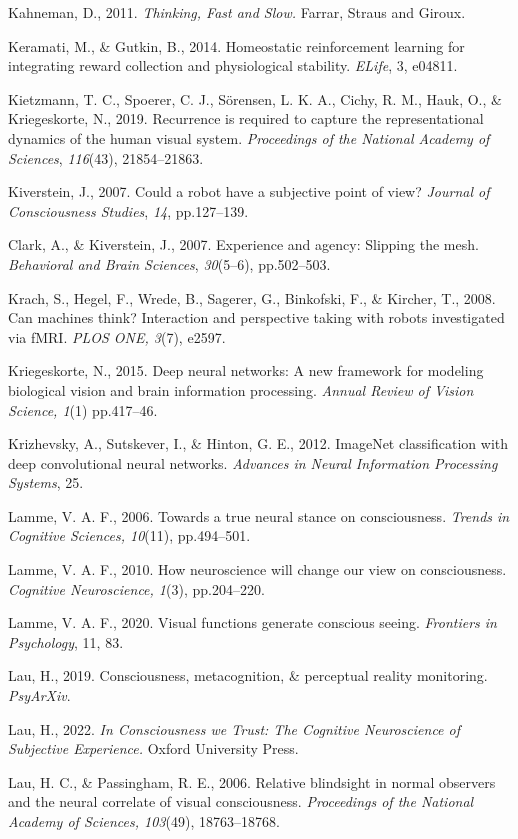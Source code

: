 \documentclass[12pt]{article}
\begin{document}
Kahneman, D., 2011. \emph{Thinking, Fast and Slow.} Farrar, Straus and
Giroux.

Keramati, M., \& Gutkin, B., 2014. Homeostatic reinforcement learning
for integrating reward collection and physiological stability.
\emph{ELife}, 3, e04811.

Kietzmann, T. C., Spoerer, C. J., Sörensen, L. K. A., Cichy, R. M.,
Hauk, O., \& Kriegeskorte, N., 2019. Recurrence is required to capture
the representational dynamics of the human visual system.
\emph{Proceedings of the National Academy of Sciences}, \emph{116}(43),
21854--21863.

Kiverstein, J., 2007. Could a robot have a subjective point of view?
\emph{Journal of Consciousness Studies}, \emph{14}, pp.127--139.

Clark, A., \& Kiverstein, J., 2007. Experience and agency: Slipping the
mesh. \emph{Behavioral and Brain Sciences}, \emph{30}(5--6),
pp.502--503.

Krach, S., Hegel, F., Wrede, B., Sagerer, G., Binkofski, F., \& Kircher,
T., 2008. Can machines think? Interaction and perspective taking with
robots investigated via fMRI. \emph{PLOS ONE, 3}(7), e2597.

Kriegeskorte, N., 2015. Deep neural networks: A new framework for
modeling biological vision and brain information processing.
\emph{Annual Review of Vision Science, 1}(1) pp.417--46.

Krizhevsky, A., Sutskever, I., \& Hinton, G. E., 2012. ImageNet
classification with deep convolutional neural networks. \emph{Advances
in Neural Information Processing Systems}, 25.

Lamme, V. A. F., 2006. Towards a true neural stance on consciousness.
\emph{Trends in Cognitive Sciences, 10}(11), pp.494--501.

Lamme, V. A. F., 2010. How neuroscience will change our view on
consciousness. \emph{Cognitive Neuroscience, 1}(3), pp.204--220.

Lamme, V. A. F., 2020. Visual functions generate conscious seeing.
\emph{Frontiers in Psychology}, 11, 83.

Lau, H., 2019. Consciousness, metacognition, \& perceptual reality
monitoring. \emph{PsyArXiv}.

Lau, H., 2022. \emph{In Consciousness we Trust: The Cognitive
Neuroscience of Subjective Experience.} Oxford University Press.

Lau, H. C., \& Passingham, R. E., 2006. Relative blindsight in normal
observers and the neural correlate of visual consciousness.
\emph{Proceedings of the National Academy of Sciences, 103}(49),
18763--18768.
\end{document}
